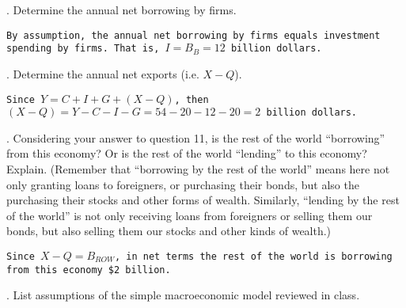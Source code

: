 \documentclass[12pt]{article}
\begin{document}
. Determine the annual net borrowing by firms.

\vspace{10pt}

\texttt{By assumption, the annual net borrowing by firms equals investment spending by firms.  That is, $I = B_B = 12$ billion dollars.}

\vspace{12pt}

. Determine the annual net exports (i.e. $X-Q$).

\vspace{10pt}

\texttt{Since $Y = C + I + G + (X-Q)$, then $(X-Q)= Y - C - I - G = 54 - 20 - 12 - 20 = 2$ billion dollars.}

\vspace{12pt}

. Considering your answer to question 11, is the rest of the world ``borrowing'' from this economy?  Or is the rest of the world ``lending'' to this economy?  Explain.  (Remember that ``borrowing by the rest of the world'' means here not only granting loans to foreigners, or purchasing their bonds, but also the purchasing their stocks and other forms of wealth.  Similarly, ``lending by the rest of the world'' is not only receiving loans from foreigners or selling them our bonds, but also selling them our stocks and other kinds of wealth.)

\vspace{10pt}

\texttt{Since $X-Q = B_{ROW}$, in net terms the rest of the world is borrowing from this economy \$2 billion.}

\vspace{12pt}

. List assumptions of the simple macroeconomic model reviewed in class.

\vspace{10pt}
\end{document}
